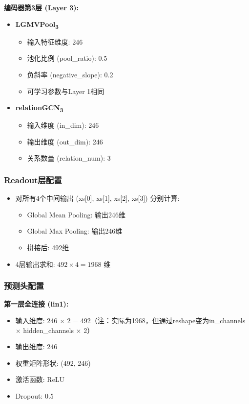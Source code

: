 \documentclass[UTF8, a4paper, 12pt]{article}
\begin{document}
\textbf{编码器第3层 (Layer 3):}

\begin{itemize}
    \item \textbf{LGMVPool\textsubscript{3}}
    \begin{itemize}
        \item 输入特征维度: 246
        \item 池化比例 (pool\_ratio): 0.5
        \item 负斜率 (negative\_slope): 0.2
        \item 可学习参数与Layer 1相同
    \end{itemize}
    \item \textbf{relationGCN\textsubscript{3}}
    \begin{itemize}
        \item 输入维度 (in\_dim): 246
        \item 输出维度 (out\_dim): 246
        \item 关系数量 (relation\_num): 3
    \end{itemize}
\end{itemize}

\subsubsection{Readout层配置}

\begin{itemize}
    \item 对所有4个中间输出 (xs[0], xs[1], xs[2], xs[3]) 分别计算:
    \begin{itemize}
        \item Global Mean Pooling: 输出246维
        \item Global Max Pooling: 输出246维
        \item 拼接后: 492维
    \end{itemize}
    \item 4层输出求和: $492 \times 4 = 1968$ 维
\end{itemize}

\subsubsection{预测头配置}

\textbf{第一层全连接 (lin1):}
\begin{itemize}
    \item 输入维度: 246 $\times$ 2 = 492（注：实际为1968，但通过reshape变为in\_channels $\times$ hidden\_channels $\times$ 2）
    \item 输出维度: 246
    \item 权重矩阵形状: (492, 246)
    \item 激活函数: ReLU
    \item Dropout: 0.5
\end{itemize}
\end{document}
